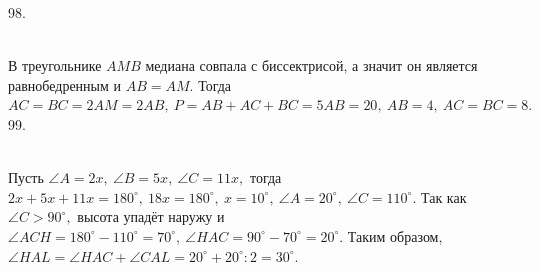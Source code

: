 \documentclass[12pt]{article}
\begin{document}
98. \begin{figure}[ht!]
\end{figure}\\
В треугольнике $AMB$ медиана совпала с биссектрисой, а значит он является равнобедренным и $AB=AM.$ Тогда $AC=BC=2AM=2AB,\ P=AB+AC+BC=5AB=20,\ AB=4,\ AC=BC=8.$\\
99.\begin{figure}[ht!]
\end{figure}\\
Пусть $\angle A=2x,\ \angle B=5x,\ \angle C=11x,$ тогда $2x+5x+11x=180^\circ,\ 18x=180^\circ,\ x=10^\circ,\ \angle A=20^\circ,\ \angle C=110^\circ.$ Так как $\angle C>90^\circ,$ высота упадёт наружу и  $\angle ACH=180^\circ-110^\circ=70^\circ,\ \angle HAC=90^\circ-70^\circ=20^\circ.$ Таким образом, $\angle HAL=\angle HAC+\angle CAL=20^\circ+20^\circ:2=30^\circ.$\newpage
\end{document}
